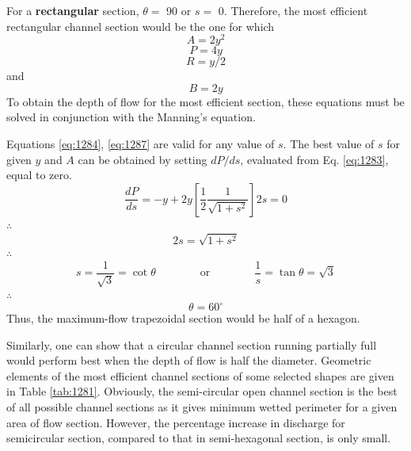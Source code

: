 \documentclass[a4paper, 12pt, british]{article} %
\numberwithin{equation}{section}
\numberwithin{figure}{section}
\numberwithin{table}{section}
\begin{document}
For a \textbf{rectangular} section, $\theta =$ 90 or $s=$ 0.
Therefore, the most efficient rectangular channel section
would be the one for which 
\begin{equation*}
A = 2y^2
\label{eq:1288}
\end{equation*}
\begin{equation}
P = 4y
\label{eq:1289}
\end{equation}
\begin{equation}
R = y/2
\label{eq:12810}
\end{equation}
and
\begin{equation}
B = 2y
\label{eq:12811a}
\end{equation}
To obtain the depth of flow for the most efficient section,
these equations must be solved in conjunction with
the Manning's equation.

Equations \ref{eq:1284}, \ref{eq:1287} are valid for any value of $s$.
The best value of $s$ for given $y$ and $A$ can be obtained
by setting $dP/ds$, evaluated from Eq. \ref{eq:1283}, equal to zero. 
\begin{equation*}
\frac{dP}{ds} = -y +2y\left [ \frac{1}{2} \frac{1}{\sqrt{1 + s^2}} \right ] 2s = 0
\end{equation*}
$\therefore$
\begin{equation*}
2s = \sqrt{1 + s^2}
\end{equation*}
$\therefore$
\begin{equation*}
s = \frac{1}{\sqrt{3}} = \cot \theta \qquad \qquad \text{or} \qquad\qquad \frac{1}{s} = \tan \theta = \sqrt{3}
\end{equation*}
$\therefore$
\begin{equation*}
\theta = 60^\circ
\end{equation*}
Thus, the maximum-flow trapezoidal section would be half of a hexagon.

Similarly, one can show that a circular channel section
running partially full would perform best when the depth of
flow is half the diameter. Geometric elements of the most
efficient channel sections of some selected shapes are given
in Table \ref{tab:1281}. Obviously, the semi-circular open channel
section is the best of all possible channel sections as it
gives minimum wetted perimeter for a given area of flow
section. However, the percentage increase in discharge for
semicircular section, compared to that in semi-hexagonal
section, is only small.
\end{document}
